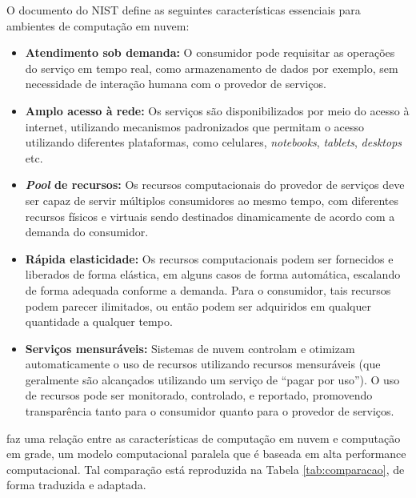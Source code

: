 \documentclass[
	12pt,				%
	a4paper,			%
	english,			%
	french,				%
	spanish,			%
	brazil				%
	]{abntex2}
\begin{document}
O documento do NIST define as seguintes características essenciais para ambientes de computação em nuvem:
\begin{itemize}
	\item \textbf{Atendimento sob demanda:} O consumidor pode requisitar as operações do serviço em tempo real, como armazenamento de dados por exemplo, sem necessidade de interação humana com o provedor de serviços.
	\item \textbf{Amplo acesso à rede:} Os serviços são disponibilizados por meio do acesso à internet, utilizando mecanismos padronizados que permitam o acesso utilizando diferentes plataformas, como celulares, \emph{notebooks}, \emph{tablets}, \emph{desktops} etc.
	\item \textbf{\emph{Pool} de recursos:} Os recursos computacionais do provedor de serviços deve ser capaz de servir múltiplos consumidores ao mesmo tempo, com diferentes recursos físicos e virtuais sendo destinados dinamicamente de acordo com a demanda do consumidor.
	\item \textbf{Rápida elasticidade:} Os recursos computacionais podem ser fornecidos e liberados de forma elástica, em alguns casos de forma automática, escalando de forma adequada conforme a demanda. Para o consumidor, tais recursos podem parecer ilimitados, ou então podem ser adquiridos em qualquer quantidade a qualquer tempo.
	\item \textbf{Serviços mensuráveis:} Sistemas de nuvem controlam e otimizam automaticamente o uso de recursos utilizando recursos mensuráveis (que geralmente são alcançados utilizando um serviço de ``pagar por uso''). O uso de recursos pode ser monitorado, controlado, e reportado, promovendo transparência tanto para o consumidor quanto para o provedor de serviços.
\end{itemize}

\citeauthor{gong2010characteristics} faz uma relação entre as características de computação em nuvem e computação em grade, um modelo computacional paralela que é baseada em alta performance computacional. Tal comparação está reproduzida na Tabela \ref{tab:comparacao}, de forma traduzida e adaptada.
\end{document}

